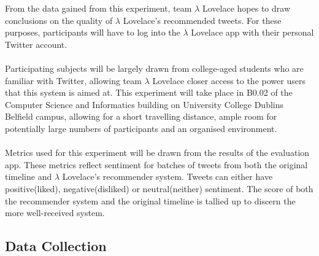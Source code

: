 \documentclass{article}
\begin{document}
From the data gained from this experiment, team $\lambda$ Lovelace hopes to draw conclusions on the quality of $\lambda$ Lovelace's recommended tweets. For these purposes, participants will have to log into the $\lambda$ Lovelace app with their personal Twitter account.
\\\\
Participating subjects will be largely drawn from college-aged students who are familiar with Twitter, allowing team $\lambda$ Lovelace closer access to the power users that this system is aimed at. This experiment will take place in B0.02 of the Computer Science and Informatics building on University College Dublins Belfield campus, allowing for a short travelling distance, ample room for potentially large numbers of participants and an organised environment.
\\\\
Metrics used for this experiment will be drawn from the results of the evaluation app. These metrics reflect sentiment for batches of tweets from both the original timeline and $\lambda$ Lovelace's recommender system. Tweets can either have positive(liked), negative(disliked) or neutral(neither) sentiment. The score of both the recommender system and the original timeline is tallied up to discern the more well-received system.

\subsection{Data Collection}
%
%
\end{document}
